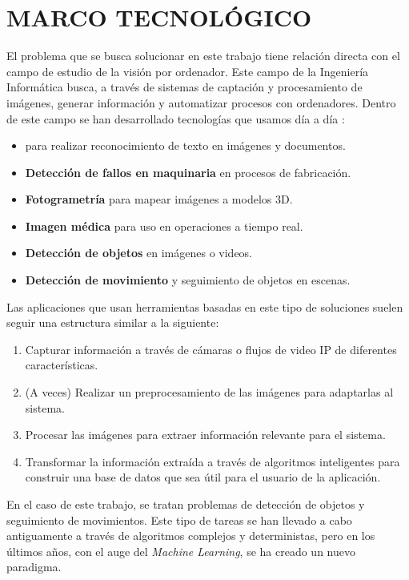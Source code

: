 \section{MARCO TECNOLÓGICO}

El problema que se busca solucionar en este trabajo tiene relación directa con el campo de estudio de la visión por ordenador. Este campo de la Ingeniería Informática busca, 
a través de sistemas de captación y procesamiento de imágenes, generar información y automatizar procesos con ordenadores. \newline Dentro de este campo se han desarrollado tecnologías que usamos día a día
\cite{szeliskiComputerVisionAlgorithms2022}:

\begin{itemize}
    \item \textbf{\textit{}} para realizar reconocimiento de texto en imágenes y documentos.
    \item \textbf{Detección de fallos en maquinaria} en procesos de fabricación.
    \item \textbf{Fotogrametría} para mapear imágenes a modelos 3D.
    \item \textbf{Imagen médica} para uso en operaciones a tiempo real\cite{NEMESIS3DCM}.
    \item \textbf{Detección de objetos} en imágenes o videos.
    \item \textbf{Detección de movimiento} y seguimiento de objetos en escenas.
\end{itemize}

Las aplicaciones que usan herramientas basadas en este tipo de soluciones suelen seguir una estructura similar a la siguiente:

\begin{enumerate}
    \item Capturar información a través de cámaras o flujos de video IP de diferentes características.
    \item (A veces) Realizar un preprocesamiento de las imágenes para adaptarlas al sistema.
    \item Procesar las imágenes para extraer información relevante para el sistema.
    \item Transformar la información extraída a través de algoritmos inteligentes para construir una base de datos que sea útil para el usuario de la aplicación.
\end{enumerate}

En el caso de este trabajo, se tratan problemas de detección de objetos y seguimiento de movimientos. Este tipo de tareas se han llevado a cabo antiguamente a través de algoritmos complejos y deterministas, pero en los últimos 
años, con el auge del \textit{Machine Learning}, se ha creado un nuevo paradigma.

